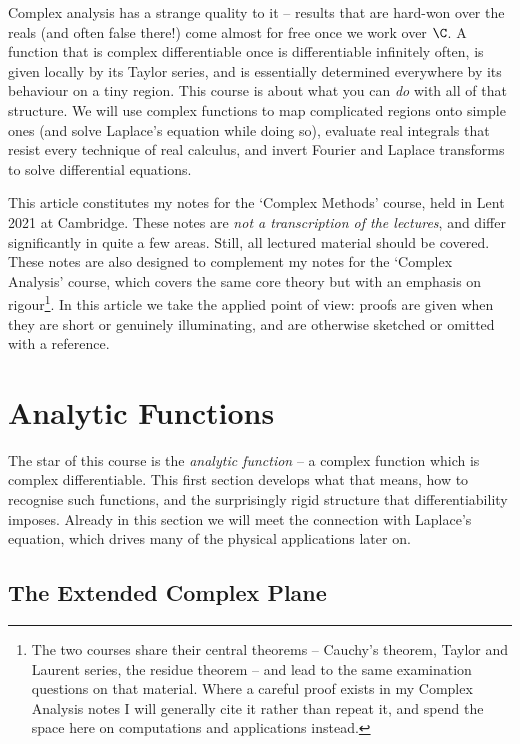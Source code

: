 



Complex analysis has a strange quality to it -- results that are hard-won over the reals (and often false there!) come almost for free once we work over $\C$. A function that is complex differentiable once is differentiable infinitely often, is given locally by its Taylor series, and is essentially determined everywhere by its behaviour on a tiny region. This course is about what you can \emph{do} with all of that structure. We will use complex functions to map complicated regions onto simple ones (and solve Laplace's equation while doing so), evaluate real integrals that resist every technique of real calculus, and invert Fourier and Laplace transforms to solve differential equations.

This article constitutes my notes for the `Complex Methods' course, held in Lent 2021 at Cambridge. These notes are \emph{not a transcription of the lectures}, and differ significantly in quite a few areas. Still, all lectured material should be covered. These notes are also designed to complement my notes for the `Complex Analysis' course, which covers the same core theory but with an emphasis on rigour\footnote{The two courses share their central theorems -- Cauchy's theorem, Taylor and Laurent series, the residue theorem -- and lead to the same examination questions on that material. Where a careful proof exists in my Complex Analysis notes I will generally cite it rather than repeat it, and spend the space here on computations and applications instead.}. In this article we take the applied point of view: proofs are given when they are short or genuinely illuminating, and are otherwise sketched or omitted with a reference.



\section{Analytic Functions}

The star of this course is the \emph{analytic function} -- a complex function which is complex differentiable. This first section develops what that means, how to recognise such functions, and the surprisingly rigid structure that differentiability imposes. Already in this section we will meet the connection with Laplace's equation, which drives many of the physical applications later on.

\subsection{The Extended Complex Plane}

